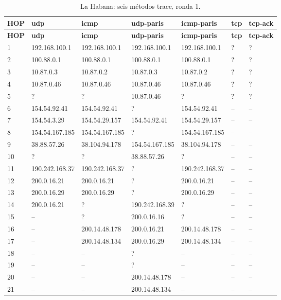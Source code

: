 \endgroup
\begin{landscape}
\begingroup
\fontsize{9}{11}\selectfont
\begin{longtable}{p{0.95cm}p{3.725cm}p{3.725cm}p{3.725cm}p{3.725cm}p{3.725cm}p{3.725cm}}
\caption{La Habana: seis métodos trace, ronda 1.}\label{anexo:trace:200.14.48.134:1} \\
\toprule
\textbf{HOP} & \textbf{udp} & \textbf{icmp} & \textbf{udp-paris} & \textbf{icmp-paris} & \textbf{tcp} & \textbf{tcp-ack} \\ \midrule
\endfirsthead
\toprule
\textbf{HOP} & \textbf{udp} & \textbf{icmp} & \textbf{udp-paris} & \textbf{icmp-paris} & \textbf{tcp} & \textbf{tcp-ack} \\ \midrule
\endhead
1 & 192.168.100.1 & 192.168.100.1 & 192.168.100.1 & 192.168.100.1 & ? & ? \\
2 & 100.88.0.1 & 100.88.0.1 & 100.88.0.1 & 100.88.0.1 & ? & ? \\
3 & 10.87.0.3 & 10.87.0.2 & 10.87.0.3 & 10.87.0.2 & ? & ? \\
4 & 10.87.0.46 & 10.87.0.46 & 10.87.0.46 & 10.87.0.46 & ? & ? \\
5 & ? & ? & 10.87.0.46 & ? & ? & ? \\
6 & 154.54.92.41 & 154.54.92.41 & ? & 154.54.92.41 & -- & -- \\
7 & 154.54.3.29 & 154.54.29.157 & 154.54.92.41 & 154.54.29.157 & -- & -- \\
8 & 154.54.167.185 & 154.54.167.185 & ? & 154.54.167.185 & -- & -- \\
9 & 38.88.57.26 & 38.104.94.178 & 154.54.167.185 & 38.104.94.178 & -- & -- \\
10 & ? & ? & 38.88.57.26 & ? & -- & -- \\
11 & 190.242.168.37 & 190.242.168.37 & ? & 190.242.168.37 & -- & -- \\
12 & 200.0.16.21 & 200.0.16.21 & ? & 200.0.16.21 & -- & -- \\
13 & 200.0.16.29 & 200.0.16.29 & ? & 200.0.16.29 & -- & -- \\
14 & 200.0.16.21 & ? & 190.242.168.39 & ? & -- & -- \\
15 & -- & ? & 200.0.16.16 & ? & -- & -- \\
16 & -- & 200.14.48.178 & 200.0.16.21 & 200.14.48.178 & -- & -- \\
17 & -- & 200.14.48.134 & 200.0.16.29 & 200.14.48.134 & -- & -- \\
18 & -- & -- & ? & -- & -- & -- \\
19 & -- & -- & ? & -- & -- & -- \\
20 & -- & -- & 200.14.48.178 & -- & -- & -- \\
21 & -- & -- & 200.14.48.134 & -- & -- & -- \\
\bottomrule
\end{longtable}
\endgroup
\end{landscape}
